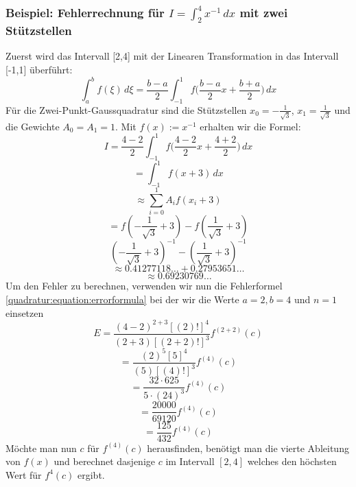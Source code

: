 \subsubsection{Beispiel: Fehlerrechnung für $I = \int_{2}^{4}x^{-1}\,dx$ mit zwei Stützstellen}
Zuerst wird das Intervall [2,4] mit der Linearen Transformation in das Intervall [-1,1] überführt:
\begin{equation}
    \int_{a}^{b} f(\xi)\,d\xi = \frac{b-a}{2}\int_{-1}^{1} f \bigg( \frac{b-a}{2} x + \frac{b+a}{2} \bigg) \,dx
\end{equation}
Für die Zwei-Punkt-Gaussquadratur sind die Stützstellen 
$x_{0}= -\frac{1}{\sqrt{3}}$, $x_{1} = \frac{1}{\sqrt{3}}$ 
und die Gewichte $A_{0} = A_{1} = 1$. Mit $f(x) := x^{-1}$ 
erhalten wir die Formel:
\begin{equation*}
    I = \frac{4-2}{2} \int_{-1}^{1} f \bigg( \frac{4-2}{2} x + \frac{4+2}{2} \bigg) \,dx
\end{equation*}
\begin{equation*}
    = \int_{-1}^{1} f (x + 3)\,dx 
\end{equation*}
\begin{equation*}
    \approx \sum_{i=0}^{1} A_{i} f(x_{i} + 3)
\end{equation*}
\begin{equation*}
    = f(-\frac{1}{\sqrt{3}}+3)-f(\frac{1}{\sqrt{3}}+3)
\end{equation*}
\begin{equation}
    (-\frac{1}{\sqrt{3}}+3)^{-1} - (\frac{1}{\sqrt{3}}+3)^{-1}
\end{equation}
\begin{equation*}
    \approx 0.41277118\dots + 0.27953651\dots
\end{equation*}
\begin{equation}
    \approx 0.69230769\dots
\end{equation}
Um den Fehler zu berechnen, verwenden wir nun die Fehlerformel \ref{quadratur:equation:errorformula}
bei der wir die Werte $a = 2, b = 4$ und $n = 1$ einsetzen
\begin{equation*}
    E = \frac{(4-2)^{2+3}[(2)!]^{4}}{(2+3)[(2+2)!]^{3}}f^{(2+2)}(c)
\end{equation*}
\begin{equation*}
    = \frac{(2)^{5}[5]^{4}}{(5)[(4)!]^{3}}f^{(4)}(c)
\end{equation*}
\begin{equation*}
    = \frac{32 \cdot 625}{5 \cdot (24)^{3}}f^{(4)}(c)
\end{equation*}
\begin{equation*}
    = \frac{20000}{69120}f^{(4)}(c)
\end{equation*}
\begin{equation}
    = \frac{125}{432}f^{(4)}(c)
\end{equation}
Möchte man nun $c$ für $f^{(4)}(c)$ herausfinden, benötigt man die 
vierte Ableitung von $f(x)$ und berechnet dasjenige $c$ im Intervall $[2, 4]$ 
welches den höchsten Wert für $f^{4}(c)$ ergibt.

